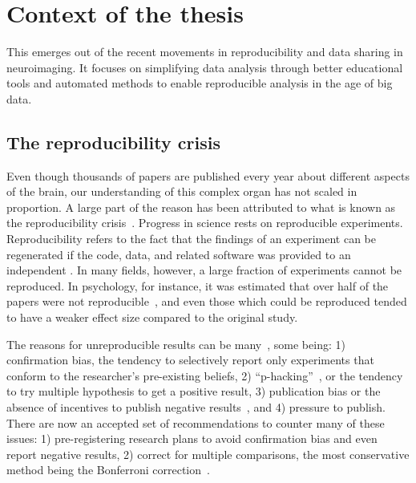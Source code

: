 \section{Context of the thesis}
This emerges out of the recent movements in reproducibility and data sharing in neuroimaging. It focuses on simplifying data analysis through better educational tools and automated methods to enable reproducible analysis in the age of big data.

\subsection{The reproducibility crisis}
\label{sec:reproducibility_crisis}
Even though thousands of papers are published every year about different aspects of the brain, our understanding of this complex organ has not scaled in proportion. A large part of the reason has been attributed to what is known as the reproducibility crisis~\citep{ioannidis2005most, simmons2011false, button2013power}. %
Progress in science rests on reproducible experiments. Reproducibility refers to the fact that the findings of an experiment can be regenerated if the code, data, and related software was provided to an independent . In many fields, however, a large fraction of experiments cannot be reproduced. In psychology, for instance, it was estimated that over half of the papers were not reproducible~\citep{open2015estimating}, and even those which could be reproduced tended to have a weaker effect size compared to the original study. 

The reasons for unreproducible results can be many~\citep{baker20161}, some being: 1) confirmation bias, the tendency to selectively report only experiments that conform to the researcher's pre-existing beliefs, 2) ``p-hacking''~\citep{simmons2011false}, or the tendency to try multiple hypothesis to get a positive result, 3) publication bias or the absence of incentives to publish negative results~\citep{rosenthal1979file}, and 4) pressure to publish. There are now an accepted set of recommendations to counter many of these issues: 1) pre-registering research plans to avoid confirmation bias and even report negative results, 2) correct for multiple comparisons, the most conservative method being the Bonferroni correction~\citep{dunn1961multiple}. 

